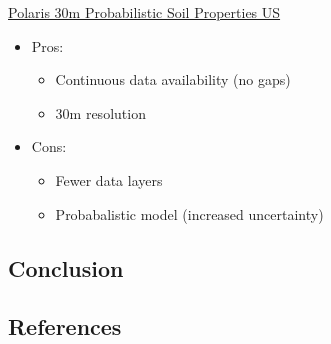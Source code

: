 \documentclass[
]{agujournal2019}
\providecommand{\tightlist}{%
  \setlength{\itemsep}{0pt}\setlength{\parskip}{0pt}}\usepackage{longtable,booktabs,array}
\begin{document}
\href{https://gee-community-catalog.org/projects/polaris/}{Polaris 30m
Probabilistic Soil Properties US}

\begin{itemize}
\tightlist
\item
  Pros:

  \begin{itemize}
  \tightlist
  \item
    Continuous data availability (no gaps)
  \item
    30m resolution
  \end{itemize}
\item
  Cons:

  \begin{itemize}
  \tightlist
  \item
    Fewer data layers
  \item
    Probabalistic model (increased uncertainty)
  \end{itemize}
\end{itemize}

\subsection{Conclusion}\label{sec-conclusions}

\subsection*{References}\label{references}
\end{document}
